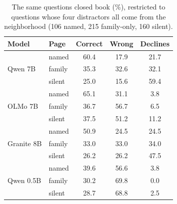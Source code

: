 \documentclass[letterpaper]{article} %
\begin{document}
\begin{table}[h]
\centering
\small
\setlength{\tabcolsep}{2.8pt}
\begin{tabular}{llccc}
\toprule
Model & Page & Correct & Wrong & Declines \\
\midrule
\multirow{3}{*}{Qwen 7B} & named & 60.4 & 17.9 & 21.7 \\
 & family & 35.3 & 32.6 & 32.1 \\
 & silent & 25.0 & 15.6 & 59.4 \\
\midrule
\multirow{3}{*}{OLMo 7B} & named & 65.1 & 31.1 & 3.8 \\
 & family & 36.7 & 56.7 & 6.5 \\
 & silent & 37.5 & 51.2 & 11.2 \\
\midrule
\multirow{3}{*}{Granite 8B} & named & 50.9 & 24.5 & 24.5 \\
 & family & 33.0 & 33.0 & 34.0 \\
 & silent & 26.2 & 26.2 & 47.5 \\
\midrule
\multirow{3}{*}{Qwen 0.5B} & named & 39.6 & 56.6 & 3.8 \\
 & family & 30.2 & 69.8 & 0.0 \\
 & silent & 28.7 & 68.8 & 2.5 \\
\bottomrule
\end{tabular}
\caption{The same questions closed book (\%), restricted to questions whose
four distractors all come from the neighborhood (106 named, 215 family-only,
160 silent).}
\label{tab:closed_full}
\end{table}
\end{document}
